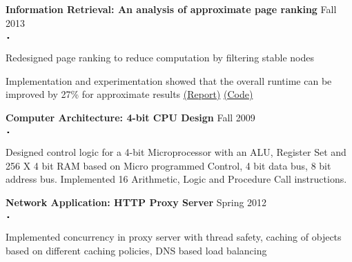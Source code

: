 \documentclass{article}
\newcommand{\sbt}{\,\begin{picture}(-1,1)(-1,-3)\circle*{2}\end{picture}\ }
\newcommand{\project}[2]{{ \textbf{#1} \hfill #2\\  }}
\newenvironment{achievements}{\begin{list}{$\sbt$}{\topsep -2pt \itemsep -2pt}}{\vspace*{0pt}\end{list}}
\begin{document}
\project{Information Retrieval: An analysis of approximate page ranking}{Fall 2013}
\begin{achievements}
	\item Redesigned page ranking to reduce computation by filtering stable nodes
	\item Implementation and experimentation showed that the overall runtime can be improved by 27\% for approximate results
	\href{https://drive.google.com/file/d/0B6dV4oJpL8T8c3VFaVlBNjc1UUE/view?usp=sharing}{(Report)}
	\href{https://github.com/ravifreek63/memoSpark}{(Code)}
\end{achievements}
\vspace{3mm}
\project{Computer Architecture: 4-bit CPU Design}{Fall 2009}
	\begin{achievements}
	 \item Designed control logic for a 4-bit Microprocessor with an ALU, Register Set and 256 X 4 bit RAM based on Micro programmed Control, 4 bit data bus, 8 bit address bus. Implemented 16 Arithmetic, Logic and Procedure Call instructions.
	\end{achievements}
\vspace{3mm} 

\project{Network Application: HTTP Proxy Server}{Spring 2012}
	\begin{achievements}
	 \item Implemented concurrency in proxy server with thread safety, caching of objects based on different caching policies, DNS based load balancing
	\end{achievements}
\vspace{3mm} 

\vspace{3mm} 
\end{document}
